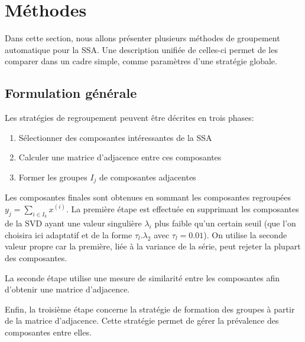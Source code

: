 \documentclass{gretsi}
\begin{document}
\section{Méthodes}\label{sec:met}
Dans cette section, nous allons présenter plusieurs méthodes de groupement automatique pour la SSA.
Une description unifiée de celles-ci permet de les comparer dans un cadre simple, comme paramètres d'une stratégie globale.

\vspace{-.4cm}
\subsection{Formulation générale}
\label{sub:form}

Les stratégies de regroupement peuvent être décrites en trois phases:
\begin{enumerate}
	\item Sélectionner des composantes intéressantes de la SSA
	\item Calculer une matrice d'adjacence entre ces composantes
	\item Former les groupes $I_j$ de composantes adjacentes
\end{enumerate}
Les composantes finales sont obtenues en sommant les composantes regroupées $y_j = \sum_{i\in I_k} x^{(i)}$.
La première étape est effectuée en supprimant les composantes de la SVD ayant une valeur singulière $\lambda_i$ plus faible qu'un certain seuil (que l'on choisira ici adaptatif et de la forme  $\tau_l.\lambda_2$ avec $\tau_l = 0.01$).
On utilise la seconde valeur propre car la première, liée à la variance de la série, peut rejeter la plupart des composantes.

La seconde étape utilise une mesure de similarité entre les composantes afin d'obtenir une matrice d'adjacence.%

Enfin, la troisième étape concerne la stratégie de formation des groupes à partir de la matrice d'adjacence. Cette stratégie permet de gérer la prévalence des composantes entre elles.
\end{document}

